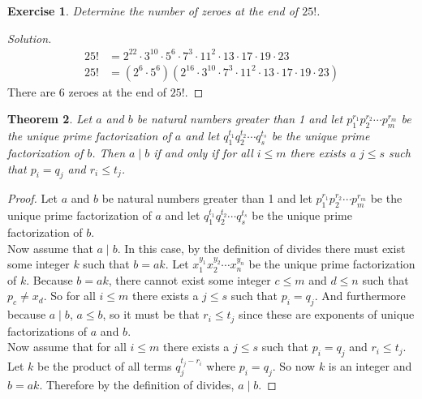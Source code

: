 \documentclass[12pt,leqno]{article}
\numberwithin{equation}{section}
\newtheorem{thm}{Theorem}[section]
\newtheorem{exer}[thm]{Exercise}
\theoremstyle{definition}
\begin{document}

\begin{exer}
Determine the number of zeroes at the end of $25!$.
\end{exer}

\begin{proof}[Solution]
\begin{align*}
25! &= 2^{22} \cdot 3^{10} \cdot 5^6 \cdot 7^3 \cdot 11^2 \cdot 13 \cdot 17 \cdot 19 \cdot 23\\
25! &= (2^6 \cdot 5^6)(2^{16} \cdot 3^{10} \cdot 7^3 \cdot 11^2 \cdot 13 \cdot 17 \cdot 19 \cdot 23)
\end{align*}
There are 6 zeroes at the end of $25!$.
\end{proof}


\begin{thm}
Let $a$ and $b$ be natural numbers greater than 1 and let $p_1^{r_1}p_2^{r_2}\cdots p_m^{r_m}$ be the unique prime factorization of $a$ and let $q_1^{t_1}q_2^{t_2}\cdots q_s^{t_s}$ be the unique prime factorization of $b$.  Then $a \mid b$ if and only if for all $i \leq m$ there exists a $j\leq s$ such that $p_i = q_j$ and $r_i \leq t_j$.
\end{thm}

\begin{proof}[Proof]
Let $a$ and $b$ be natural numbers greater than 1 and let $p_1^{r_1}p_2^{r_2}\cdots p_m^{r_m}$ be the unique prime factorization of $a$ and let $q_1^{t_1}q_2^{t_2}\cdots q_s^{t_s}$ be the unique prime factorization of $b$.\\
Now assume that $a \mid b$.  In this case, by the definition of divides there must exist some integer $k$ such that $b = ak$.  Let $x_1^{y_1}x_2^{y_2}\cdots x_n^{y_n}$ be the unique prime factorization of $k$.  Because $b = ak$, there cannot exist some integer $c \leq m$ and $d \leq n$ such that $p_c \neq x_d$.  So for all $i \leq m$ there exists a $j\leq s$ such that $p_i = q_j$.  And furthermore because $a\mid b$, $a \leq b$, so it must be that $r_i \leq t_j$ since these are exponents of unique factorizations of $a$ and $b$.\\
Now assume that for all $i \leq m$ there exists a $j\leq s$ such that $p_i = q_j$ and $r_i \leq t_j$.  Let $k$ be the product of all terms $q_j^{t_j-r_i}$ where $p_i = q_j$.  So now $k$ is an integer and $b = ak$.  Therefore by the definition of divides, $a \mid b$.
\end{proof}
\end{document}
